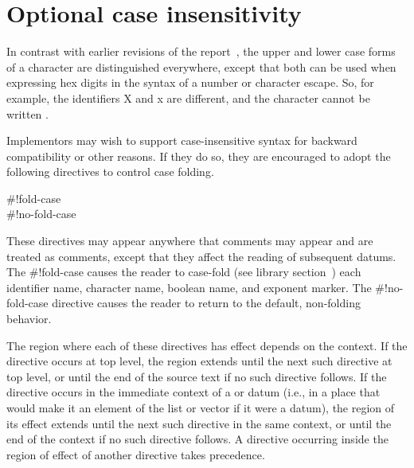 \chapter{Optional case insensitivity}
\label{caseinsensitivityappendix}

In contrast with earlier revisions of the report~\cite{R5RS}, the
upper and lower case forms of a character are distinguished
everywhere, except that both can be used when expressing hex digits in
the syntax of a number or character escape.  So, for example, the
identifiers {\cf X} and {\cf x} are different, and the character
 cannot be written .

Implementors may wish to support case-insensitive syntax for backward
compatibility or other reasons.
If they do so, they are encouraged to adopt the following directives
to control case folding.

\begin{entry}{%
{\cf{}\#!fold-case}\\
{\cf{}\#!no-fold-case}}

These directives may appear anywhere that comments may appear and are
treated as comments, except that they affect the reading of subsequent
datums.
The {\cf{}\#!fold-case} causes the reader to case-fold
(see library section~)
each identifier name, character name, boolean name, and exponent marker.
The {\cf{}\#!no-fold-case} directive causes the reader to return
to the default, non-folding behavior.

The region where each of these directives has effect depends on the
context. If the directive occurs at top level, the region extends
until the next such directive at top level, or until the end of the
source text if no such directive follows.  If the directive occurs in
the immediate context of a  or  datum (i.e.,
in a place that would make it an element of the list or vector if it
were a datum), the region of its effect extends until the next such
directive in the same context, or until the end of the context if no
such directive follows. A directive occurring inside the region of
effect of another directive takes precedence.
\end{entry}

